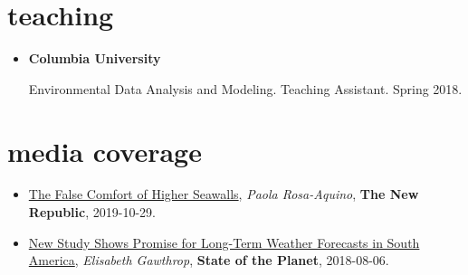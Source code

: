 \documentclass[10pt,oneside]{article}
\begin{document}

\section{\color{BrickRed}teaching}

\mbox{}\vspace{-\dimexpr\baselineskip\relax}


\begin{itemize}[label={}]

  \item \textbf{Columbia University}

        Environmental Data Analysis and Modeling. Teaching Assistant. Spring 2018.


\end{itemize}

%
%
%
%
%
%  
%        
%


\section{\color{BrickRed}media coverage}

\mbox{}\vspace{-\dimexpr\baselineskip\relax}

\begin{itemize}[label={}]

  \item \href{https://newrepublic.com/article/155519/false-comfort-higher-seawalls}{The False Comfort of Higher Seawalls}, \textit{Paola Rosa-Aquino}, \textbf{The New Republic}, 2019-10-29.

  \item \href{https://blogs.ei.columbia.edu/2018/08/06/subseasonal-weather-forecasts-paraguay/}{New Study Shows Promise for Long-Term Weather Forecasts in South America}, \textit{Elisabeth Gawthrop}, \textbf{State of the Planet}, 2018-08-06.

\end{itemize}
\end{document}
